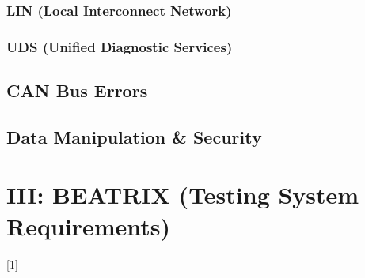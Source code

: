 \subsection{LIN (Local Interconnect Network)}

\subsection{UDS (Unified Diagnostic Services)}

\section{CAN Bus Errors}

\section{Data Manipulation \& Security}








\chapter{III: BEATRIX (Testing System Requirements)}

\begin{chapterabstract}
	\lipsum[1]
\end{chapterabstract}

\lipsum[2][1-4]{} [1]

\lipsum[4]


